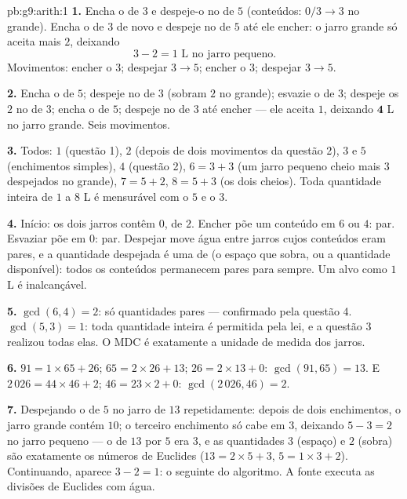 \begin{solution}{pb:g9:arith:1}
\textbf{1.} Encha o de $3$ e despeje-o no de $5$ (conteúdos:
$0/3 \to 3$ no grande). Encha o de $3$ de novo e despeje no de $5$ até
ele encher: o jarro grande só aceita mais $2$, deixando
\[
3 - 2 = 1 \text{ L no jarro pequeno.}
\]
Movimentos: encher o $3$; despejar $3 \to 5$; encher o $3$; despejar
$3 \to 5$.

\textbf{2.} Encha o de $5$; despeje no de $3$ (sobram $2$ no grande);
esvazie o de $3$; despeje os $2$ no de $3$; encha o de $5$; despeje no
de $3$ até encher --- ele aceita $1$, deixando $\mathbf{4}$ L no jarro
grande. Seis movimentos.

\textbf{3.} Todos: $1$ (questão 1), $2$ (depois de dois movimentos da
questão 2), $3$ e $5$ (enchimentos simples), $4$ (questão 2),
$6 = 3 + 3$ (um jarro pequeno cheio mais $3$ despejados no grande),
$7 = 5 + 2$, $8 = 5 + 3$ (os dois cheios). Toda quantidade inteira de
$1$ a $8$ L é mensurável com o $5$ e o $3$.

\textbf{4.} Início: os dois jarros contêm $0$,  de $2$. Encher
põe um conteúdo em $6$ ou $4$: par. Esvaziar põe em $0$: par. Despejar
move água entre jarros cujos conteúdos eram pares, e a quantidade
despejada é uma  de  (o espaço que sobra, ou a
quantidade disponível): todos os conteúdos permanecem pares para
sempre. Um alvo  como $1$ L é inalcançável.

\textbf{5.} $\gcd(6, 4) = 2$: só quantidades pares --- confirmado pela
questão 4. $\gcd(5, 3) = 1$: toda quantidade inteira é permitida pela
lei, e a questão 3 realizou todas elas. O MDC é exatamente a unidade de
medida dos jarros.

\textbf{6.} $91 = 1 \times 65 + 26$; $65 = 2 \times 26 + 13$;
$26 = 2 \times 13 + 0$: $\gcd(91, 65) = 13$. E
$2\,026 = 44 \times 46 + 2$; $46 = 23 \times 2 + 0$:
$\gcd(2\,026, 46) = 2$.

\textbf{7.} Despejando o de $5$ no jarro de $13$ repetidamente: depois
de dois enchimentos, o jarro grande contém $10$; o terceiro enchimento
só cabe em $3$, deixando $5 - 3 = 2$ no jarro pequeno --- o  de
$13$ por $5$ era $3$, e as quantidades $3$ (espaço) e $2$ (sobra) são
exatamente os números de Euclides ($13 = 2 \times 5 + 3$,
$5 = 1 \times 3 + 2$). Continuando, aparece $3 - 2 = 1$: o 
seguinte do algoritmo. A fonte executa as divisões de Euclides com
água.


\end{solution}
